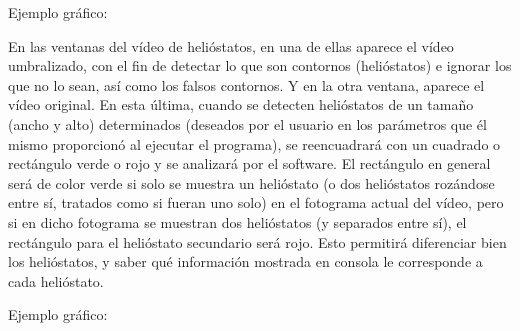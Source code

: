 \documentclass[12pt]{article}
\begin{document}
Ejemplo gráfico:



En las ventanas del vídeo de helióstatos, en una de ellas aparece el vídeo umbralizado, con el fin de detectar lo que son contornos (helióstatos) e ignorar los que no lo sean, así como los falsos contornos. Y en la otra ventana, aparece el vídeo original. En esta última, cuando se detecten helióstatos de un tamaño (ancho y alto) determinados (deseados por el usuario en los parámetros que él mismo proporcionó al ejecutar el programa), se reencuadrará con un cuadrado o rectángulo verde o rojo y se analizará por el software. El rectángulo en general será de color verde si solo se muestra un helióstato (o dos helióstatos rozándose entre sí, tratados como si fueran uno solo) en el fotograma actual del vídeo, pero si en dicho fotograma se muestran dos helióstatos (y separados entre sí), el rectángulo para el helióstato secundario será rojo. Esto permitirá diferenciar bien los helióstatos, y saber qué información mostrada en consola le corresponde a cada helióstato.

Ejemplo gráfico:
\end{document}
